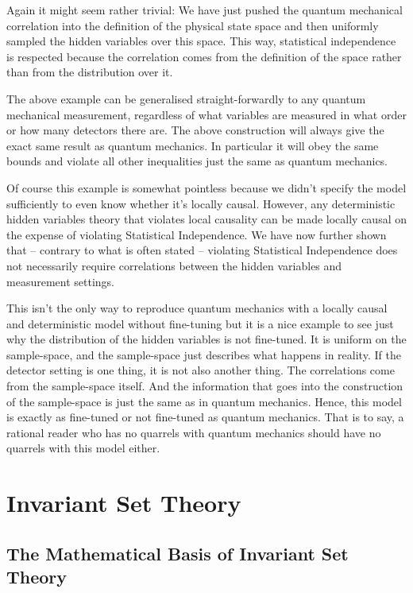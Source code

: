 \documentclass[12pt,superscriptaddress]{revtex4-2}
\begin{document}
Again it might seem rather trivial: We have just pushed the quantum mechanical correlation into the definition of the physical state space and then uniformly sampled the hidden variables over this space. This way, statistical independence is respected because the correlation comes from the definition of the space rather than from the distribution over it. 


The above example can be generalised straight-forwardly to any quantum mechanical measurement, regardless of what variables are measured in what order or how many detectors there are. The above construction will always give the exact same result as quantum mechanics. In particular it will obey the same bounds and violate all other inequalities just the same as quantum mechanics. 

Of course this example is somewhat pointless because we didn't specify the model sufficiently to even know whether it's locally causal. However, any deterministic hidden variables theory that violates local causality can be made locally causal on the expense of violating Statistical Independence. We have now further shown that -- contrary to what is often stated -- violating Statistical Independence does not necessarily require correlations between the hidden variables and measurement settings.

This isn't the only way to reproduce quantum mechanics with a locally causal and deterministic model without fine-tuning \cite{Donadi2020SuperdetToy} but it is a nice example to see just why the distribution of the hidden variables is not fine-tuned. It is uniform on the sample-space, and the sample-space just describes what happens in reality. If the detector setting is one thing, it is not also another thing. The correlations come from the sample-space itself. And the information that goes into the construction of the sample-space is just the same as in quantum mechanics. Hence, this model is exactly as fine-tuned or not fine-tuned as quantum mechanics. That is to say, a rational reader who has no quarrels with quantum mechanics should have no quarrels with this model either.


\section{Invariant Set Theory}
\label{IST}


\subsection{The Mathematical Basis of Invariant Set Theory}
\label{istmath}
\end{document}
